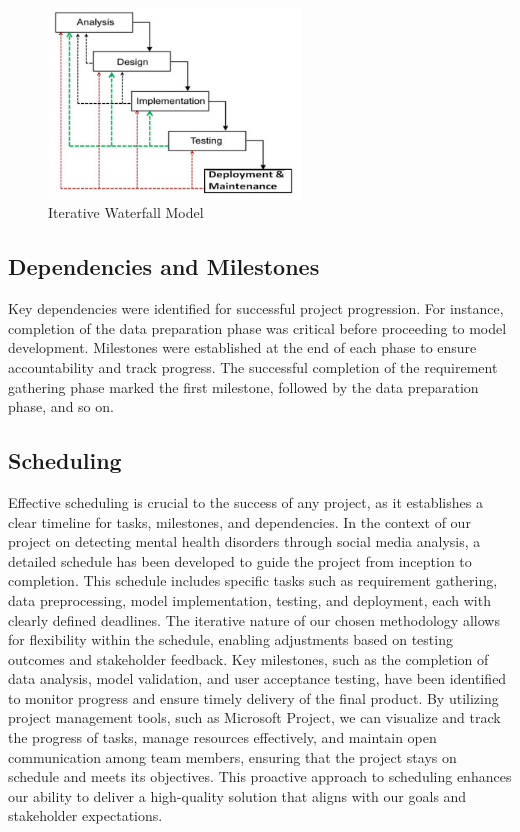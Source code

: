 \begin{figure}[h!]  
    \centering
    \includegraphics[width=0.6\textwidth]{Images/01 Life_cycle.jpg}  
    \caption{Iterative Waterfall Model}
    \label{Iterative Waterfall Model}  %
\end{figure}


\subsection{Dependencies and Milestones} 
\noindent
Key dependencies were identified for successful project progression. For instance, completion of the data preparation phase was critical before proceeding to model development. Milestones were established at the end of each phase to ensure accountability and track progress. The successful completion of the requirement gathering phase marked the first milestone, followed by the data preparation phase, and so on.

\subsection{Scheduling}
\noindent
Effective scheduling is crucial to the success of any project, as it establishes a clear timeline for tasks, milestones, and dependencies. In the context of our project on detecting mental health disorders through social media analysis, a detailed schedule has been developed to guide the project from inception to completion. This schedule includes specific tasks such as requirement gathering, data preprocessing, model implementation, testing, and deployment, each with clearly defined deadlines. The iterative nature of our chosen methodology allows for flexibility within the schedule, enabling adjustments based on testing outcomes and stakeholder feedback. Key milestones, such as the completion of data analysis, model validation, and user acceptance testing, have been identified to monitor progress and ensure timely delivery of the final product. By utilizing project management tools, such as Microsoft Project, we can visualize and track the progress of tasks, manage resources effectively, and maintain open communication among team members, ensuring that the project stays on schedule and meets its objectives. This proactive approach to scheduling enhances our ability to deliver a high-quality solution that aligns with our goals and stakeholder expectations.

